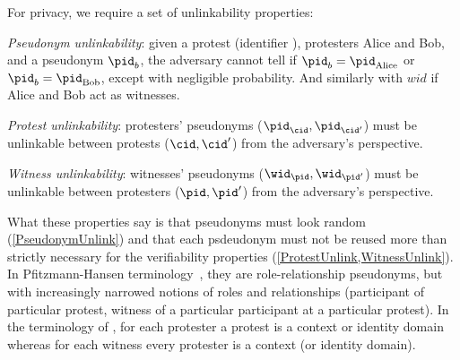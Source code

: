 For privacy, we require a set of unlinkability properties:%
\label{privacy-properties}
\begin{requirements}[P]
\item\label{PseudonymUnlink} \emph{Pseudonym unlinkability}: given a protest 
  (identifier \cid), protesters Alice and Bob, and a pseudonym \(\pid_b\), the 
  adversary cannot tell if \(\pid_b = \pid_{\text{Alice}}\) or \(\pid_b = 
    \pid_{\text{Bob}}\), except with negligible probability. And similarly with $wid$ if Alice and Bob act as witnesses.
\item\label{ProtestUnlink} \emph{Protest unlinkability}: protesters' pseudonyms 
  (\(\pid_\cid, \pid_{\cid'}\)) must be unlinkable between protests (\(\cid, 
    \cid'\)) from the adversary's perspective.
\item\label{WitnessUnlink}\emph{Witness unlinkability}:  witnesses' pseudonyms 
  (\(\wid_\pid, \wid_{\pid'}\)) must be unlinkable between protesters (\(\pid, 
    \pid'\)) from the adversary's perspective.
\end{requirements}

What these properties say is that pseudonyms must look random 
(\cref{PseudonymUnlink}) and that each psdeudonym must not be reused
more than strictly necessary for the verifiability properties 
(\cref{ProtestUnlink,WitnessUnlink}). In Pfitzmann-Hansen
terminology~\cite{pfitzmann-hansen}, they are role-relationship
pseudonyms, but with increasingly narrowed notions of roles and
relationships (participant of particular protest, witness of a
particular participant at a particular protest).
In the terminology of \textcite{SybilFreePseudonyms}, for each protester a 
protest is a context or identity domain whereas for each witness every 
protester is a context (or identity domain).
